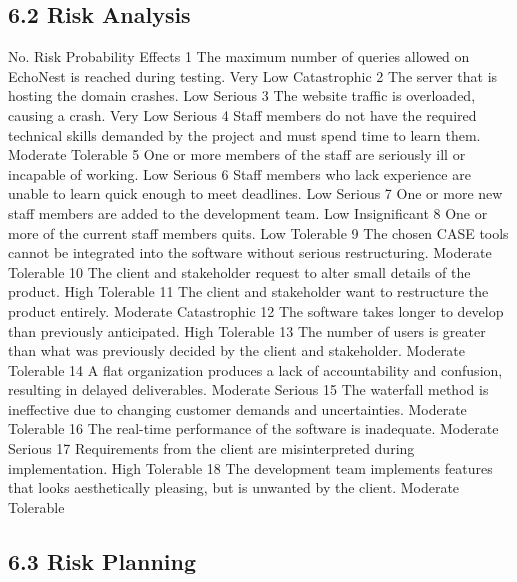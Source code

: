 \documentclass[]{article}
\begin{document}
\subsection{6.2 Risk Analysis}\label{risk-analysis}

No. Risk Probability Effects 1 The maximum number of queries allowed on
EchoNest is reached during testing. Very Low Catastrophic 2 The server
that is hosting the domain crashes. Low Serious 3 The website traffic is
overloaded, causing a crash. Very Low Serious 4 Staff members do not
have the required technical skills demanded by the project and must
spend time to learn them. Moderate Tolerable 5 One or more members of
the staff are seriously ill or incapable of working. Low Serious 6 Staff
members who lack experience are unable to learn quick enough to meet
deadlines. Low Serious 7 One or more new staff members are added to the
development team. Low Insignificant 8 One or more of the current staff
members quits. Low Tolerable 9 The chosen CASE tools cannot be
integrated into the software without serious restructuring. Moderate
Tolerable 10 The client and stakeholder request to alter small details
of the product. High Tolerable 11 The client and stakeholder want to
restructure the product entirely. Moderate Catastrophic 12 The software
takes longer to develop than previously anticipated. High Tolerable 13
The number of users is greater than what was previously decided by the
client and stakeholder. Moderate Tolerable 14 A flat organization
produces a lack of accountability and confusion, resulting in delayed
deliverables. Moderate Serious 15 The waterfall method is ineffective
due to changing customer demands and uncertainties. Moderate Tolerable
16 The real-time performance of the software is inadequate. Moderate
Serious 17 Requirements from the client are misinterpreted during
implementation. High Tolerable 18 The development team implements
features that looks aesthetically pleasing, but is unwanted by the
client. Moderate Tolerable

\subsection{6.3 Risk Planning}\label{risk-planning}
\end{document}

